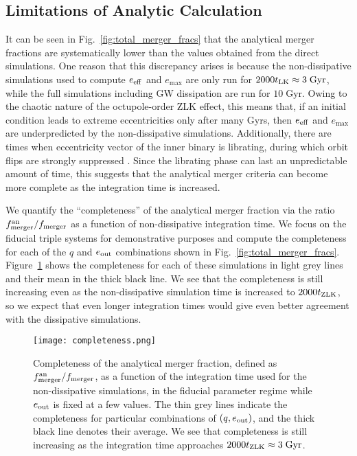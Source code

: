 \documentclass[
        fleqn,
        usenatbib,
    ]{mnras}
\begin{document}
\subsection{Limitations of Analytic Calculation}\label{ss:completeness}

It can be seen in Fig.~\ref{fig:total_merger_fracs} that the analytical
merger fractions are systematically lower than the values obtained from the
direct simulations. One reason that this discrepancy arises is because the
non-dissipative simulations used to compute $e_{\rm eff}$ and $e_{\max}$ are
only run for $2000 t_{\rm LK} \approx 3\;\mathrm{Gyr}$, while the full
simulations including GW dissipation are run for $10\;\mathrm{Gyr}$. Owing to
the chaotic nature of the octupole-order ZLK effect, this means that, if an
initial condition leads to extreme eccentricities only after many Gyrs, then
$e_{\rm eff}$ and $e_{\max}$ are underpredicted by the non-dissipative
simulations. Additionally, there are times when eccentricity vector of the inner
binary is librating, during which orbit flips are strongly suppressed
\citep{katz2011long}. Since the librating phase can last an unpredictable amount
of time, this suggests that the analytical merger criteria can become more
complete as the integration time is increased.

We quantify the ``completeness'' of the analytical merger fraction via the ratio
$f_{\rm merger}^{\rm an} / f_{\rm merger}$ as a function of non-dissipative
integration time. We focus on the fiducial triple systems for
demonstrative purposes and compute the completeness for each of the $q$ and
$e_{\rm out}$ combinations shown in Fig.~\ref{fig:total_merger_fracs}.
Figure~\ref{fig:completeness} shows the completeness for each of these
simulations in light grey lines and their mean in the thick black line. We see
that the completeness is still increasing even as the non-dissipative simulation
time is increased to $2000t_{\rm ZLK}$, so we expect that even longer
integration times would give even better agreement with the dissipative
simulations.
\begin{figure}
    \centering
    \texttt{[image: completeness.png]}
    \caption{Completeness of the analytical merger fraction, defined as
    $f_{\rm merger}^{\rm an} / f_{\rm merger}$, as a function of the integration time
    used for the non-dissipative simulations, in the fiducial
    parameter regime while $e_{\rm out}$ is fixed at a few values. The thin grey
    lines indicate the completeness for particular combinations of $(q, e_{\rm
    out})$, and the thick black line denotes their average. We see that
    completeness is still increasing as the integration time approaches $2000
    t_{\rm ZLK} \approx 3\;\mathrm{Gyr}$. }\label{fig:completeness}
\end{figure}
\end{document}
